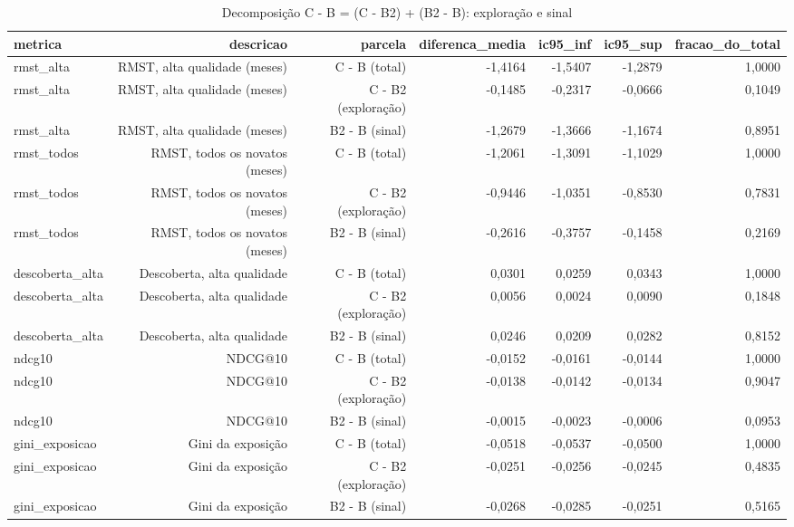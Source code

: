 \begin{table}[ht]
\centering
\caption{Decomposição C - B = (C - B2) + (B2 - B): exploração e sinal}
\label{tab:decomposicao}
\begin{tabular}{lrrrrrr}
\hline
\textbf{metrica} & \textbf{descricao} & \textbf{parcela} & \textbf{diferenca\_media} & \textbf{ic95\_inf} & \textbf{ic95\_sup} & \textbf{fracao\_do\_total} \\
\hline
rmst\_alta & RMST, alta qualidade (meses) & C - B (total) & -1,4164 & -1,5407 & -1,2879 & 1,0000 \\
rmst\_alta & RMST, alta qualidade (meses) & C - B2 (exploração) & -0,1485 & -0,2317 & -0,0666 & 0,1049 \\
rmst\_alta & RMST, alta qualidade (meses) & B2 - B (sinal) & -1,2679 & -1,3666 & -1,1674 & 0,8951 \\
rmst\_todos & RMST, todos os novatos (meses) & C - B (total) & -1,2061 & -1,3091 & -1,1029 & 1,0000 \\
rmst\_todos & RMST, todos os novatos (meses) & C - B2 (exploração) & -0,9446 & -1,0351 & -0,8530 & 0,7831 \\
rmst\_todos & RMST, todos os novatos (meses) & B2 - B (sinal) & -0,2616 & -0,3757 & -0,1458 & 0,2169 \\
descoberta\_alta & Descoberta, alta qualidade & C - B (total) & 0,0301 & 0,0259 & 0,0343 & 1,0000 \\
descoberta\_alta & Descoberta, alta qualidade & C - B2 (exploração) & 0,0056 & 0,0024 & 0,0090 & 0,1848 \\
descoberta\_alta & Descoberta, alta qualidade & B2 - B (sinal) & 0,0246 & 0,0209 & 0,0282 & 0,8152 \\
ndcg10 & NDCG@10 & C - B (total) & -0,0152 & -0,0161 & -0,0144 & 1,0000 \\
ndcg10 & NDCG@10 & C - B2 (exploração) & -0,0138 & -0,0142 & -0,0134 & 0,9047 \\
ndcg10 & NDCG@10 & B2 - B (sinal) & -0,0015 & -0,0023 & -0,0006 & 0,0953 \\
gini\_exposicao & Gini da exposição & C - B (total) & -0,0518 & -0,0537 & -0,0500 & 1,0000 \\
gini\_exposicao & Gini da exposição & C - B2 (exploração) & -0,0251 & -0,0256 & -0,0245 & 0,4835 \\
gini\_exposicao & Gini da exposição & B2 - B (sinal) & -0,0268 & -0,0285 & -0,0251 & 0,5165 \\
\hline
\end{tabular}
\end{table}
